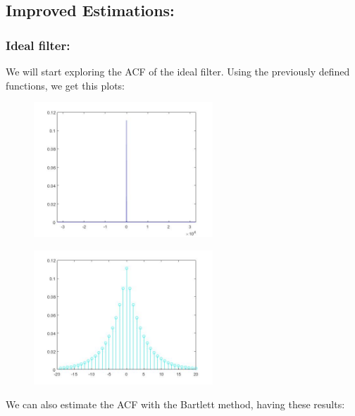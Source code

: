 \documentclass[a4paper,11pt]{article}
\begin{document}
\subsection{Improved Estimations:}

\subsubsection{Ideal filter:}

We will start exploring the ACF of the ideal filter. Using the previously defined functions, we get this plots:

\begin{figure}[!hp]
    \begin{center}
    \includegraphics[width=0.6\textwidth]{images/lab2_figure1.jpg}
    \end{center}
\end{figure}

\begin{figure}[!hp]
    \begin{center}
    \includegraphics[width=0.6\textwidth]{images/lab2_figure2.jpg}
    \end{center}
\end{figure}

\newpage

We can also estimate the ACF with the Bartlett method, having these results:
\end{document}
